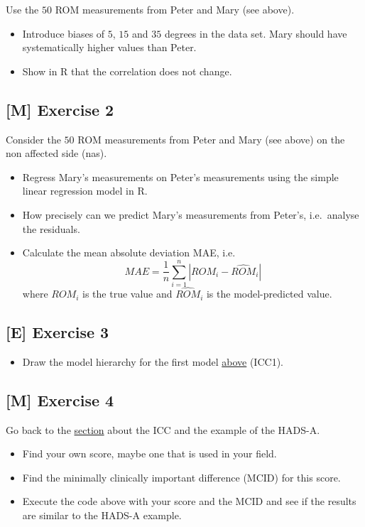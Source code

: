 \documentclass[
]{book}
\providecommand{\tightlist}{%
  \setlength{\itemsep}{0pt}\setlength{\parskip}{0pt}}
\begin{document}
Use the \(50\) ROM measurements from Peter and Mary (see above).

\begin{itemize}
\tightlist
\item
  Introduce biases of \(5\), \(15\) and \(35\) degrees in the data set. Mary should have systematically
  higher values than Peter.
\item
  Show in R that the correlation does not change.
\end{itemize}

\subsection{{[}M{]} Exercise 2}\label{exercise2}

Consider the \(50\) ROM measurements from Peter and Mary (see above) on the non affected side (nas).

\begin{itemize}
\tightlist
\item
  Regress Mary's measurements on Peter's measurements using the simple
  linear regression model in R.
\item
  How precisely can we predict Mary's measurements from Peter's, i.e.~analyse the residuals.
\item
  Calculate the mean absolute deviation MAE, i.e.~
  \[MAE = \frac{1}{n} \sum_{i=1}^n |ROM_i - \widehat{ROM}_i|\]
  where \(ROM_i\) is the true value and \(\widehat{ROM}_i\) is the model-predicted value.
\end{itemize}

\subsection{{[}E{]} Exercise 3}\label{exercise3}

\begin{itemize}
\tightlist
\item
  Draw the model hierarchy for the first model \hyperref[ICC]{above} (ICC1).
\end{itemize}

\subsection{{[}M{]} Exercise 4}\label{exercise4}

Go back to the \hyperref[badnews]{section} about the ICC and the example of the HADS-A.

\begin{itemize}
\tightlist
\item
  Find your own score, maybe one that is used in your field.
\item
  Find the minimally clinically important difference (MCID) for this score.
\item
  Execute the code above with your score and the MCID and see if
  the results are similar to the HADS-A example.
\end{itemize}
\end{document}
